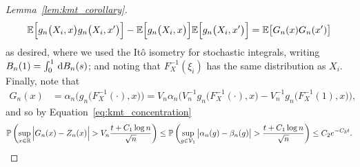 \begin{proof}[Lemma~\ref{lem:kmt_corollary}]
\begin{align*}
    \mathbb{E}\Big[
      g_n\big(X_i, x\big)
      g_n\big(X_i, x'\big)
      \Big]
    - \mathbb{E}\Big[
      g_n\big(X_i, x\big)
      \Big]
    \mathbb{E}\Big[
      g_n\big(X_i, x'\big)
      \Big]
    =
    \mathbb{E}\big[
      G_n(x)
      G_n(x')
      \big]
  \end{align*}
  as desired, where we used the It\^o isometry for stochastic integrals,
  writing
  $B_n(1) = \int_0^1 \,\mathrm{d}B_n(s)$;
  and noting that $F_X^{-1}(\xi_i)$
  has the same distribution as $X_i$.
  Finally, note that
  \begin{align*}
    G_n(x)
    &=
    \alpha_n \Big(g_n\big(F_X^{-1}(\cdot), x\big)\Big)
    = V_n \alpha_n \Big(
    V_n^{-1} g_n\big(F_X^{-1}(\cdot), x\big)
    - V_n^{-1} g_n\big(F_X^{-1}(1), x\big)
    \Big),
  \end{align*}
  and so by Equation~\ref{eq:kmt_concentration}
  \begin{align*}
    \mathbb{P}\left(
      \sup_{x \in \mathbb{R}}
      \Big|G_n(x) - Z_n(x)\Big|
      > V_n \frac{t + C_1 \log n}{\sqrt n}
    \right)
    \leq
    \mathbb{P}\left(
      \sup_{g \in \mathcal{V}_1}
      \big|\alpha_n(g) - \beta_n(g)\big|
      > \frac{t + C_1\log n}{\sqrt{n}}
    \right)
    \leq C_2 e^{-C_3 t}.
  \end{align*}
\end{proof}

